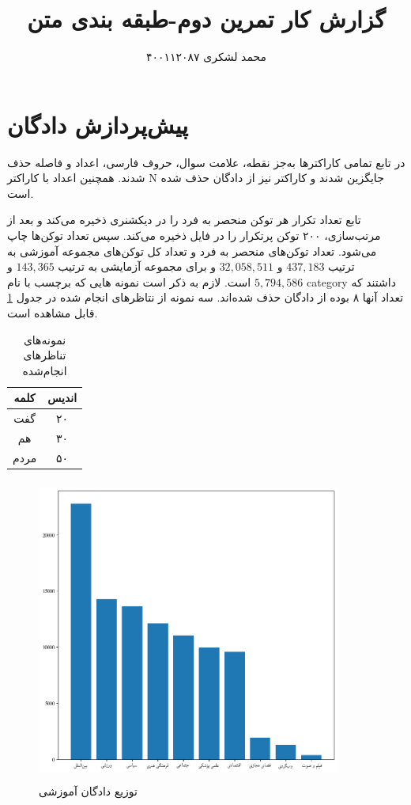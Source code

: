 \documentclass{article}
\title{گزارش کار تمرین دوم-طبقه بندی متن}
\author{محمد لشکری ۴۰۰۱۱۲۰۸۷}
\begin{document}
	\maketitle
	\section{پیش‌پردازش دادگان}
	در تابع 
	تمامی کاراکتر‌ها به‌جز نقطه، علامت سوال، حروف فارسی، اعداد و فاصله حذف شدند. همچنین اعداد با کاراکتر N جایگزین شدند و کاراکتر 
	نیز از دادگان حذف شده ‌است. 
	
	تابع 
	تعداد تکرار هر توکن منحصر به فرد را در دیکشنری 
	ذخیره می‌کند و بعد از مرتب‌سازی، ۲۰۰ توکن پرتکرار را در فایل 
	ذخیره می‌کند. سپس تعداد توکن‌ها چاپ می‌شود. تعداد توکن‌های منحصر به فرد و تعداد کل توکن‌های مجموعه آموزشی به ترتیب
	 $ 437,183 $
	  و
	   $ 32,058,511 $
	     و برای مجموعه آزمایشی به ترتیب
	     $ 143,365 $
	       و
	       $ 5,794,586 $
	        است.
	لازم به ذکر است نمونه هایی که برچسب با نام category داشتند که تعداد آنها ۸ بوده از دادگان حذف شده‌اند. 
	سه نمونه از نتاظر‌های انجام شده در جدول \ref{table1} قابل مشاهده است.
	\begin{table}[h]
		\begin{center}
			\begin{tabular}{|c|c|}
				\hline
				کلمه & اندیس \\
				\hline
				\hline
				گفت & ۲۰ \\
				هم &  ۳۰ \\
				مردم & ۵۰ \\
				\hline
			\end{tabular}
		\caption{نمونه‌های تناظرهای انجام‌شده}
		\label{table1}
		\end{center}
	\end{table}
	\begin{figure}[h]
		\begin{center}
			\includegraphics[height=10cm, width=10cm]{plot.png}
			\caption{توزیع دادگان آموزشی}
			\label{plot}
		\end{center}
	\end{figure}
	\newpage
\end{document}

